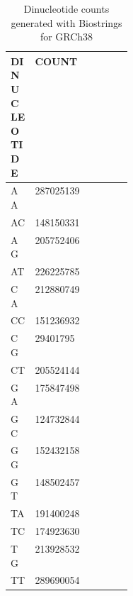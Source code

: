 \begin{table}[!ht]
\caption[Dinucleotide counts of GRCh38]{Dinucleotide counts generated with Biostrings \cite{Pages2020} for GRCh38}\label{A:mmf:tab:dicounts}
\centering
{}
\begin{tabular}{|C{0.2\linewidth} | R{0.2\textwidth}|}
\toprule
 \hline
 \textbf{DINUCLEOTIDE} & \textbf{COUNT}\\
 \hline
       AA   & \num{287025139} \\
       AC   & \num{148150331} \\
       AG   & \num{205752406} \\
       AT   & \num{226225785} \\
       CA   & \num{212880749} \\
       CC   & \num{151236932} \\
       CG   & \num{29401795} \\
       CT   & \num{205524144} \\
       GA   & \num{175847498} \\
       GC   & \num{124732844} \\
       GG   & \num{152432158} \\
       GT   & \num{148502457} \\
       TA   & \num{191400248} \\
       TC   & \num{174923630} \\
       TG   & \num{213928532} \\
       TT   & \num{289690054} \\ 
 \hline
 \bottomrule
\end{tabular}
\end{table}

